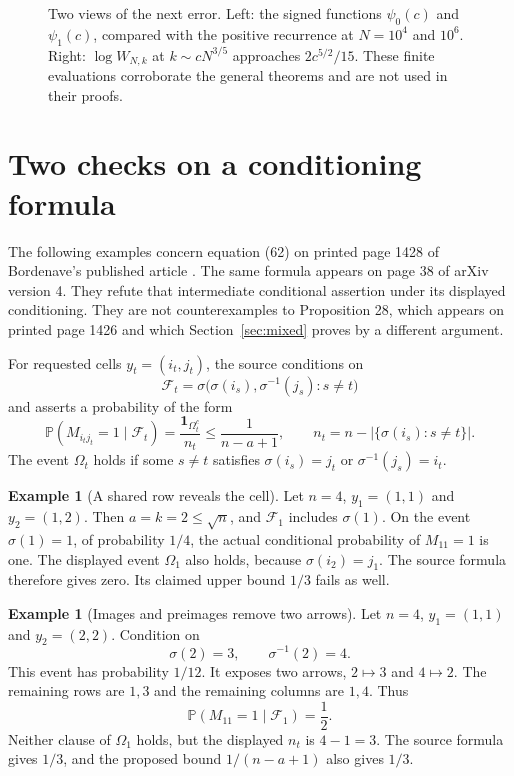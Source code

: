\documentclass[11pt]{article}
\theoremstyle{definition}
\newtheorem{example}[theorem]{Example}
\theoremstyle{remark}
\newcommand{\PP}{\mathbb P}
\newcommand{\1}{\mathbf 1}
\begin{document}
\begin{figure}[htbp]
\caption{Two views of the next error. Left: the signed functions $\psi_0(c)$ and $\psi_1(c)$, compared with the positive recurrence at $N=10^4$ and $10^6$. Right: $\log W_{N,k}$ at $k\sim cN^{3/5}$ approaches $2c^{5/2}/15$. These finite evaluations corroborate the general theorems and are not used in their proofs.}
\label{fig:ratehierarchy}
\end{figure}


\section{Two checks on a conditioning formula}\label{sec:conditioning}

The following examples concern equation (62) on printed page 1428 of Bordenave's published article \cite{Bordenave}. The same formula appears on page 38 of arXiv version 4. They refute that intermediate conditional assertion under its displayed conditioning. They are not counterexamples to Proposition 28, which appears on printed page 1426 and which Section~\ref{sec:mixed} proves by a different argument.

For requested cells $y_t=(i_t,j_t)$, the source conditions on
\[
\mathcal F_t=\sigma\bigl(\sigma(i_s),\sigma^{-1}(j_s):s\ne t\bigr)
\]
and asserts a probability of the form
\[
\PP(M_{i_tj_t}=1\mid\mathcal F_t)
=\frac{\1_{\Omega_t^c}}{n_t}\le\frac1{n-a+1},
\qquad
n_t=n-|\{\sigma(i_s):s\ne t\}|.
\]
The event $\Omega_t$ holds if some $s\ne t$ satisfies $\sigma(i_s)=j_t$ or $\sigma^{-1}(j_s)=i_t$.

\begin{example}[A shared row reveals the cell]
Let $n=4$, $y_1=(1,1)$ and $y_2=(1,2)$. Then $a=k=2\le\sqrt n$, and $\mathcal F_1$ includes $\sigma(1)$. On the event $\sigma(1)=1$, of probability $1/4$, the actual conditional probability of $M_{11}=1$ is one. The displayed event $\Omega_1$ also holds, because $\sigma(i_2)=j_1$. The source formula therefore gives zero. Its claimed upper bound $1/3$ fails as well.
\end{example}

\begin{example}[Images and preimages remove two arrows]
Let $n=4$, $y_1=(1,1)$ and $y_2=(2,2)$. Condition on
\[
\sigma(2)=3,\qquad \sigma^{-1}(2)=4.
\]
This event has probability $1/12$. It exposes two arrows, $2\mapsto3$ and $4\mapsto2$. The remaining rows are $1,3$ and the remaining columns are $1,4$. Thus
\[
\PP(M_{11}=1\mid\mathcal F_1)=\frac12.
\]
Neither clause of $\Omega_1$ holds, but the displayed $n_t$ is $4-1=3$. The source formula gives $1/3$, and the proposed bound $1/(n-a+1)$ also gives $1/3$.
\end{example}
\end{document}

